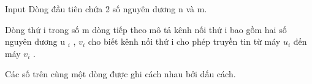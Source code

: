 Input
Dòng đầu tiên chứa 2 số nguyên dương n và m.

Dòng thứ i trong số m dòng tiếp theo mô tả kênh nối thứ i bao gồm hai số nguyên dương u­ $_ i $ , $v_{i}$ cho biết kênh nối thứ i cho phép truyền tin từ máy $u_{i}$ đến máy $v_{i}$ .

Các số trên cùng một dòng được ghi cách nhau bởi dấu cách.